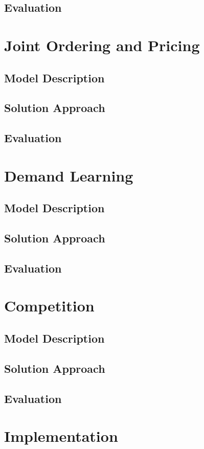 \subsection{Evaluation}


\section{Joint Ordering and Pricing}
\subsection{Model Description}
\subsection{Solution Approach}
\subsection{Evaluation}

\section{Demand Learning}
\subsection{Model Description}
\subsection{Solution Approach}
\subsection{Evaluation}

\section{Competition}
\subsection{Model Description}
\subsection{Solution Approach}
\subsection{Evaluation}

\section{Implementation}
